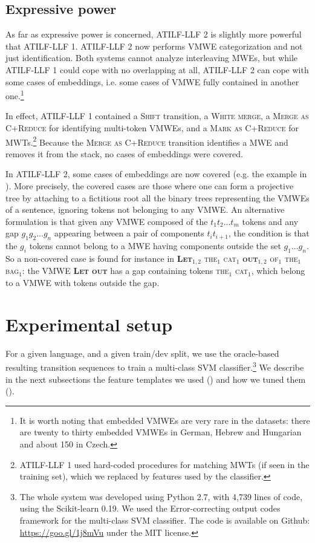 \documentclass[output=paper,modfonts]{langscibook}
\begin{document}
\subsection{Expressive power}
As far as expressive power is concerned, ATILF-LLF 2 is slightly more powerful that ATILF-LLF 1. ATILF-LLF 2 now performs VMWE categorization and not just identification. Both systems cannot analyze interleaving MWEs, but while ATILF-LLF 1 could cope with no overlapping at all, ATILF-LLF 2 can cope with some cases of embeddings, i.e. some cases of VMWE fully contained in another one.\footnote{It is worth noting that embedded VMWEs are very rare in the datasets: there are twenty to thirty embedded VMWEs in German, Hebrew and Hungarian and about 150 in Czech.}

In effect, ATILF-LLF 1 contained a \textsc{Shift} transition, a \textsc{White merge}, a \textsc{Merge as C+Reduce} for identifying multi-token VMWEs, and a \textsc{Mark as C+Reduce} for MWTs.\footnote{ATILF-LLF 1 used hard-coded procedures for matching MWTs (if seen in the training set), which we replaced by features used by the classifier.} Because the \textsc{Merge as C+Reduce} transition identifies a MWE and removes it from the stack, no cases of embeddings were covered.

In ATILF-LLF 2, some cases of embeddings are now covered (e.g. the example in ). More precisely, the covered cases are those where one can form a projective tree by attaching to a fictitious root all the binary trees representing the VMWEs of a sentence, ignoring tokens not belonging to any VMWE. An alternative formulation is that given any VMWE composed of the $t_1 t_2 ... t_m$ tokens and any gap $g_1 g_2 ... g_n$ appearing between a pair of components $t_i t_{i+1}$, the condition is that the $g_i$ tokens cannot belong to a MWE having components outside the set $g_1 ... g_n$. So a non-covered case is found for instance in \textsc{\textbf{{Let$_{1,2}$}} {the$_{1}$} {cat$_{1}$} \textbf{{out$_{1,2}$}} {of$_{1}$} {the$_{1}$}  {bag$_{1}$}}: the VMWE \textsc{\textbf{Let out}} has a gap containing tokens \textsc{{the$_{1}$} {cat$_{1}$}}, which belong to a VMWE with tokens outside the gap.

\section{Experimental setup}
For a given language, and a given train/dev split, we use the oracle-based resulting transition sequences to train a multi-class SVM classifier.\footnote{The whole system was developed using Python 2.7, with 4,739 lines of code, using the Scikit-learn 0.19. We used the Error-correcting output codes framework for the multi-class SVM classifier. The code is available on Github: \url{https://goo.gl/1j8mVu} under the MIT license.}
We describe in the next subsections the feature templates we used () and how we tuned them (). 
\end{document}
